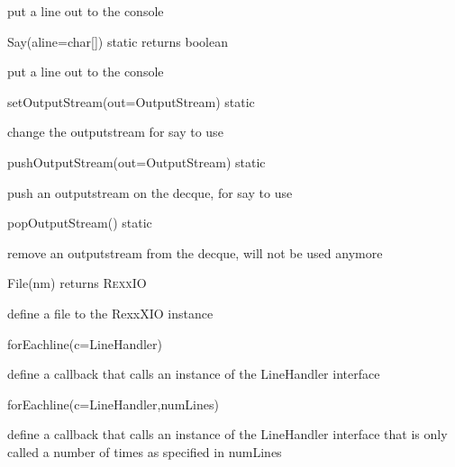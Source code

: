 \begin{description}
put a line out to the console
  \item{Say(aline=char[]) static returns boolean}

put a line out to the console
  \item{setOutputStream(out=OutputStream) static}


change the outputstream for say to use  
 
\item{pushOutputStream(out=OutputStream) static}


push an outputstream on the decque, for say to use
  \item{popOutputStream() static}

remove an outputstream from the decque, will not be used anymore
  \item{File(nm) returns R\textsc{exx}IO}

define a file to the RexxXIO instance
  \item{forEachline(c=LineHandler)}

define a callback that calls an instance of the LineHandler interface
  \item{forEachline(c=LineHandler,numLines)}

define a callback that calls an instance of the LineHandler interface that is only called a number of times as specified in numLines
\end{description}

